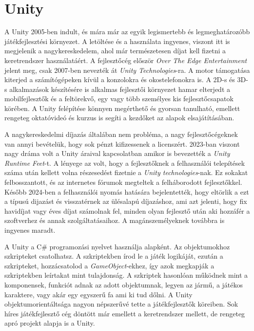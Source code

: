 \documentclass[
]{thesis-ekf}
\theoremstyle{definition}
\theoremstyle{remark}
\begin{document}
\section{Unity}
A Unity 2005-ben indult, és mára már az egyik legismertebb és legmeghatározóbb játékfejlesztési környezet. A letöltése és a használata ingyenes, viszont itt is megjelenik a nagykereskedelem, ahol már természetesen díjat kell fizetni a keretrendszer használatáért.
A fejlesztőcég először \textit{Over The Edge Entertainment} jelent meg, csak 2007-ben nevezték át \textit{Unity Technologies}-ra. \cite{unity_technologies}
A motor támogatása kiterjed a számítógépeken kívül a konzolokra és okostelefonokra is. A 2D-s és 3D-s alkalmazások készítésére is alkalmas fejlesztői környezet hamar elterjedt a mobilfejlesztők és a feltörekvő, egy vagy több személyes kis fejlesztőcsapatok körében. A Unity felépítése könnyen megérthető és gyorsan tanulható, emellett rengeteg oktatóvideó és kurzus is segíti a kezdőket az alapok elsajátításában.\cite{unity_technologies}

A nagykereskedelmi díjazás általában nem probléma, a nagy fejlesztőcégeknek van annyi bevételük, hogy sok pénzt kifizessenek a licenszért. 2023-ban viszont nagy dráma volt a Unity áraival kapcsolatban amikor is bevezették a \textit{Unity Runtime Feet}-t. A lényege az volt, hogy a fejlesztőknek a felhasználói telepítések száma után kellett volna részesedést fizetnie a \textit{Unity technologies}-nak. Ez sokakat felbosszantott, és az internetes fórumok megteltek a felháborodott fejlesztőkkel. Később 2024-ben a felhasználói nyomás hatására bejelentették, hogy eltörlik a ezt a típusú dijazást és visszatérnek az ülésalapú díjazáshoz, ami azt jelenti, hogy fix havidíjat vagy éves díjat számolnak fel, minden olyan fejlesztő után aki hozzáfér a szoftverhez és annak szolgáltatásaihoz. A magánszemélyeknek továbbra is ingyenes maradt.\cite{unity_technologies}

A Unity a C\# programozási nyelvet használja alapként. Az objektumokhoz szkripteket csatolhatsz. A szkriptekben írod le a játék logikáját, ezután a szkripteket, hozzácsatolod a \textit{GameObject}-ekhez, így azok megkapják a szkriptekben leírtakat mint tulajdonság. A szkriptek hasonlóan működnek mint a komponensek, funkciót adnak az adott objektumnak, legyen az jármű, a játékos karaktere, vagy akár egy egyszerű fa ami ki tud dőlni. A Unity objektumorientáltsága nagyon népszerűvé tette a játékfejlesztők köreiben. Sok híres játékfejlesztő cég döntött már emellett a keretrendszer mellett, de rengeteg apró projekt alapja is a Unity.
\end{document}
